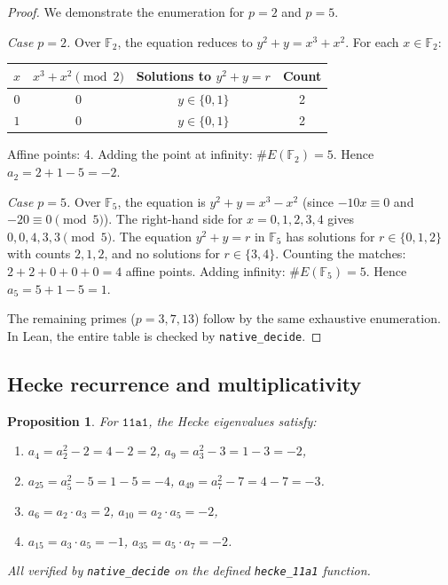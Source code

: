 \documentclass[11pt]{article}
\theoremstyle{plain}
\newtheorem{proposition}[theorem]{Proposition}
\theoremstyle{definition}
\theoremstyle{remark}
\newcommand{\F}{\mathbb{F}}
\begin{document}
\begin{proof}
We demonstrate the enumeration for $p = 2$ and $p = 5$.

\emph{Case $p = 2$.} Over $\F_2$, the equation reduces to $y^2 + y = x^3 + x^2$. For each $x \in \F_2$:
\begin{center}
\begin{tabular}{cccc}
$x$ & $x^3 + x^2 \pmod{2}$ & Solutions to $y^2 + y = r$ & Count \\
\hline
$0$ & $0$ & $y \in \{0, 1\}$ & 2 \\
$1$ & $0$ & $y \in \{0, 1\}$ & 2
\end{tabular}
\end{center}
Affine points: 4. Adding the point at infinity: $\#E(\F_2) = 5$. Hence $a_2 = 2 + 1 - 5 = -2$. \checkmark

\emph{Case $p = 5$.} Over $\F_5$, the equation is $y^2 + y = x^3 - x^2$ (since $-10x \equiv 0$ and $-20 \equiv 0 \pmod{5}$). The right-hand side for $x = 0, 1, 2, 3, 4$ gives $0, 0, 4, 3, 3 \pmod{5}$. The equation $y^2 + y = r$ in $\F_5$ has solutions for $r \in \{0, 1, 2\}$ with counts $2, 1, 2$, and no solutions for $r \in \{3, 4\}$. Counting the matches: $2 + 2 + 0 + 0 + 0 = 4$ affine points. Adding infinity: $\#E(\F_5) = 5$. Hence $a_5 = 5 + 1 - 5 = 1$. \checkmark

The remaining primes ($p = 3, 7, 13$) follow by the same exhaustive enumeration. In Lean, the entire table is checked by \texttt{native\_decide}.
\end{proof}

\subsection{Hecke recurrence and multiplicativity}

\begin{proposition}\label{prop:recurrence11a1}
For $\texttt{11a1}$, the Hecke eigenvalues satisfy:
\begin{enumerate}[nosep,label=(\roman*)]
\item $a_4 = a_2^2 - 2 = 4 - 2 = 2$, \quad $a_9 = a_3^2 - 3 = 1 - 3 = -2$,
\item $a_{25} = a_5^2 - 5 = 1 - 5 = -4$, \quad $a_{49} = a_7^2 - 7 = 4 - 7 = -3$.
\item $a_6 = a_2 \cdot a_3 = 2$, \quad $a_{10} = a_2 \cdot a_5 = -2$,
\item $a_{15} = a_3 \cdot a_5 = -1$, \quad $a_{35} = a_5 \cdot a_7 = -2$.
\end{enumerate}
All verified by \texttt{native\_decide} on the defined \texttt{hecke\_11a1} function.
\end{proposition}
\end{document}
